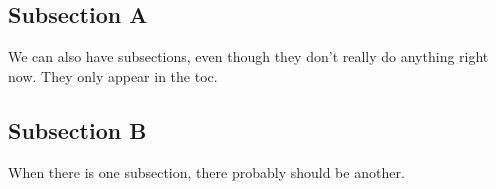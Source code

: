 \documentclass[final]{beamer}
\begin{document}
\subsection{Subsection A}
\begin{frame}{\mbox{}}
We can also have subsections, even though they don't really do anything right now. They only appear in the toc. 
\end{frame}
%
%
%
%
%
\subsection{Subsection B}
\begin{frame}{\mbox{}}
When there is one subsection, there probably should be another.
\end{frame}
%
%
%
%
%
\end{document}
